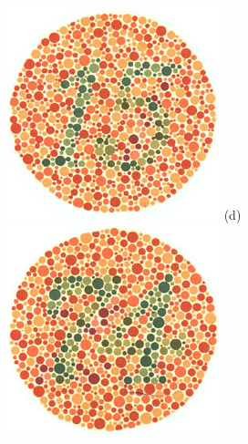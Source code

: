 \documentclass[	12pt, Times, openright, twoside, a4paper, english, brazil]{abntex2}
\begin{document}
\begin{apendicesenv}
\begin{figure}[!htb]
\centering
{\includegraphics[width=\linewidth]{ishihara-transformacao/plate8.png}}
(d)
\endminipage\hfill
{}
\centering
{\includegraphics[width=\linewidth]{ishihara-transformacao/plate9.png}}

\end{figure}
\end{apendicesenv}
\end{document}
